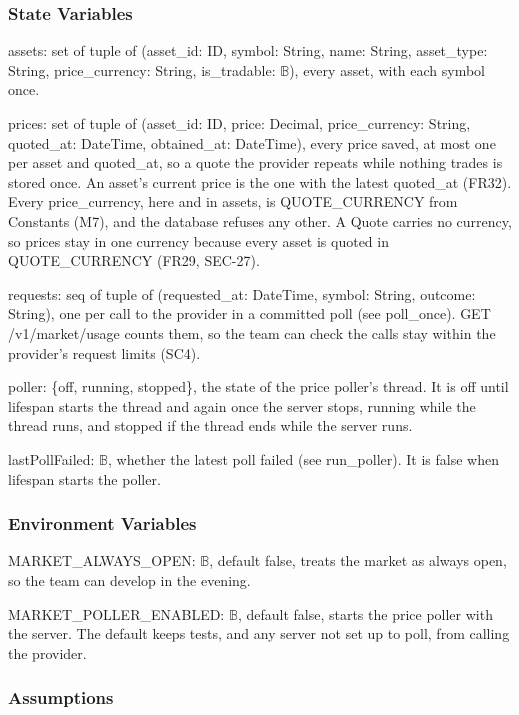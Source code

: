 \documentclass[12pt, titlepage]{article}
\begin{document}
\subsubsection{State Variables}

\noindent assets: set of tuple of (asset\_id: ID, symbol: String, name: String,
asset\_type: String, price\_currency: String, is\_tradable: $\mathbb{B}$), every
asset, with each symbol once.

\medskip
\noindent prices: set of tuple of (asset\_id: ID, price: Decimal,
price\_currency: String, quoted\_at: DateTime, obtained\_at: DateTime), every
price saved, at most one per asset and quoted\_at, so a quote the provider
repeats while nothing trades is stored once. An asset's current price is the
one with the latest quoted\_at (FR32). Every price\_currency, here and in
assets, is QUOTE\_CURRENCY from Constants (M7), and the database refuses any
other. A Quote carries no currency, so prices stay in one currency because
every asset is quoted in QUOTE\_CURRENCY (FR29, SEC-27).

\medskip
\noindent requests: seq of tuple of (requested\_at: DateTime, symbol: String,
outcome: String), one per call to the provider in a committed poll (see
poll\_once). GET /v1/market/usage counts them, so the team can check the calls
stay within the provider's request limits (SC4).

\medskip
\noindent poller: \{off, running, stopped\}, the state of the price poller's
thread. It is off until lifespan starts the thread and again once the server
stops, running while the thread runs, and stopped if the thread ends while the
server runs.

\medskip
\noindent lastPollFailed: $\mathbb{B}$, whether the latest poll failed (see
run\_poller). It is false when lifespan starts the poller.

\subsubsection{Environment Variables}

\noindent MARKET\_ALWAYS\_OPEN: $\mathbb{B}$, default false, treats the market as
always open, so the team can develop in the evening.

\noindent MARKET\_POLLER\_ENABLED: $\mathbb{B}$, default false, starts the price
poller with the server. The default keeps tests, and any server not set up to
poll, from calling the provider.

\subsubsection{Assumptions}
\end{document}
